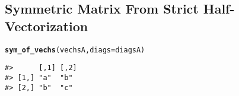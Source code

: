 \documentclass{article}\usepackage[]{graphicx}\usepackage[]{color}
\makeatletter
\newcommand{\hlstd}[1]{\textcolor[rgb]{0.345,0.345,0.345}{#1}}%
\newcommand{\hlkwc}[1]{\textcolor[rgb]{0.333,0.667,0.333}{#1}}%
\newcommand{\hlkwd}[1]{\textcolor[rgb]{0.737,0.353,0.396}{\textbf{#1}}}%
\newenvironment{kframe}{%
 \def\at@end@of@kframe{}%
 \ifinner\ifhmode%
  \def\at@end@of@kframe{\end{minipage}}%
  \begin{minipage}{\columnwidth}%
 \fi\fi%
 \def\FrameCommand##1{\hskip\@totalleftmargin \hskip-\fboxsep
 \colorbox{shadecolor}{##1}\hskip-\fboxsep
     \hskip-\linewidth \hskip-\@totalleftmargin \hskip\columnwidth}%
 \MakeFramed {\advance\hsize-\width
   \@totalleftmargin\z@ \linewidth\hsize
   \@setminipage}}%
 {\par\unskip\endMakeFramed%
 \at@end@of@kframe}
\newenvironment{knitrout}{}{} %
\makeatother
\begin{document}
\subsection*{Symmetric Matrix From Strict Half-Vectorization}

\begin{knitrout}
\color{fgcolor}\begin{kframe}
\begin{alltt}
\hlkwd{sym_of_vechs}\hlstd{(vechsA,} \hlkwc{diags} \hlstd{= diagsA)}
\end{alltt}
\begin{verbatim}
#>      [,1] [,2]
#> [1,] "a"  "b" 
#> [2,] "b"  "c"
\end{verbatim}
\end{kframe}
\end{knitrout}



\nocite{R-2021}

\printbibliography
\end{document}
